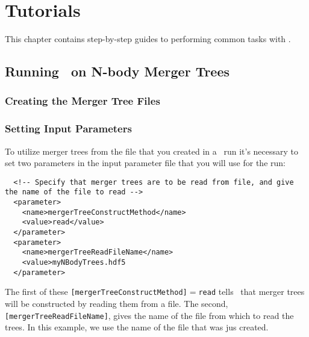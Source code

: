 \chapter{Tutorials}

This chapter contains step-by-step guides to performing common tasks with \glc.

\section{Running \glc\ on N-body Merger Trees}\label{sec:nBodyRun}

\subsection{Creating the Merger Tree Files}

\subsection{Setting Input Parameters}

To utilize merger trees from the file that you created in a \glc\ run it's necessary to set two parameters in the input parameter file that you will use for the run:
\begin{verbatim}
  <!-- Specify that merger trees are to be read from file, and give the name of the file to read -->
  <parameter>
    <name>mergerTreeConstructMethod</name>
    <value>read</value>
  </parameter>
  <parameter>
    <name>mergerTreeReadFileName</name>
    <value>myNBodyTrees.hdf5
  </parameter>
\end{verbatim}
The first of these {\tt [mergerTreeConstructMethod]}$=${\tt read} tells \glc\ that merger trees will be constructed by reading them from a file. The second, {\tt [mergerTreeReadFileName]}, gives the name of the file from which to read the trees. In this example, we use the name of the file that was jus created.

